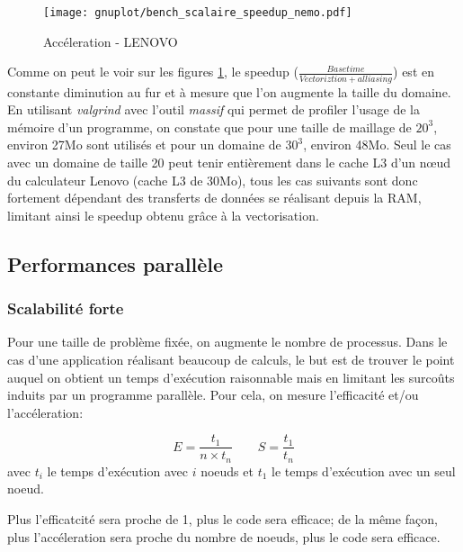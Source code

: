 \begin{figure}[!ht]
  \centering
  \texttt{[image: gnuplot/bench\_scalaire\_speedup\_nemo.pdf]}
  \caption{\label{fig:bench_scal_nemo_speedup}Accéleration - LENOVO}
\end{figure}

Comme on peut le voir sur les figures \ref{fig:bench_scal_nemo_speedup}, le speedup ($\frac{Base time}{Vectoriztion+alliasing}$) est en constante diminution au fur et à mesure que l'on augmente la taille du domaine. En utilisant \textit{valgrind} avec l'outil \textit{massif} qui permet de profiler l'usage de la mémoire d'un programme, on constate que pour une taille de maillage de $20^3$, environ 27Mo sont utilisés et pour un domaine de $30^3$, environ 48Mo. Seul le cas avec un domaine de taille 20 peut tenir entièrement dans le cache L3 d'un nœud du calculateur Lenovo (cache L3 de 30Mo), tous les cas suivants sont donc fortement dépendant des transferts de données se réalisant depuis la RAM, limitant ainsi le speedup obtenu grâce à la vectorisation.

\subsection{Performances parallèle}\label{sec:scal}


\subsubsection{Scalabilité forte}\label{sec:scal-strong}
Pour une taille de problème fixée, on augmente le nombre de processus. Dans le cas d'une application réalisant beaucoup de calculs, le but est de trouver le point auquel on obtient un temps d'exécution raisonnable mais en limitant les surcoûts induits par un programme parallèle. Pour cela, on mesure l'efficacité et/ou l'accéleration:

$$E=\frac{t_1}{n\times t_n} \qquad S=\frac{t_1}{t_n}$$ avec $t_i$ le temps d'exécution avec $i$ noeuds et $t_1$ le temps d'exécution avec un seul noeud. 

Plus l'efficatcité sera proche de 1, plus le code sera efficace; de la même façon, plus l'accéleration sera proche du nombre de noeuds, plus le code sera efficace.

